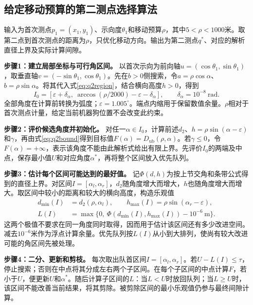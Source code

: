 \documentclass[UTF8,a4paper,12pt,fontset=fandol]{ctexart}
\newcommand{\nextpage}{\clearpage}
\begin{document}
\subsection{给定移动预算的第二测点选择算法}
输入为首次测点$p_1=(x_1,y_1)$、示向度$\theta_1$和移动预算$\rho$，其中$5<\rho<1000$米。取第二点到首次测点的距离为$\rho$，只优化移动方向。输出为第二测点$q^*$、对应的解析直径上界及实际计算间隙。

\noindent\textbf{步骤1：建立局部坐标与可行角区间。}
以首次示向为前向轴$u=(\cos\theta_1,\sin\theta_1)$，取垂直轴$v=(-\sin\theta_1,\cos\theta_1)$。先在$b>0$侧搜索，令$a=\rho\cos\alpha$、$b=\rho\sin\alpha$。将其代入式\eqref{eq:q2region}，结合横向高度$h>0$，得到
\begin{equation}\label{eq:q2angles}
 I_0=[\varepsilon+\delta_\alpha,\ \arccos(\rho/2000)-\varepsilon-\delta_\alpha],
 \qquad\delta_\alpha=10^{-8}\ \mathrm{rad}.
\end{equation}
全部角度在计算前转换为弧度；$\varepsilon=1.005^\circ$。端点内缩用于保留数值余量。$\rho$相对于首次测点计量，给定当前机器狗位置不会改变此约束。

\noindent\textbf{步骤2：评价候选角度并初始化。}
对任一$\alpha\in I_0$，计算前述$d_2$、$h=\rho\sin(\alpha-\varepsilon)$和$\gamma$，再由式\eqref{eq:q2bound}得到目标值$F(\alpha)=D_{\mathrm{ub}}(\rho,\alpha)$。若$\gamma\le0$，令$F(\alpha)=+\infty$，表示该角度不能由此解析式给出有限上界。先评价$I_0$的两端及中点，保存最小值$U$和对应角度$\alpha^*$，再将整个区间放入优先队列。

\nextpage
\noindent\textbf{步骤3：估计每个区间可能达到的最好值。}
记$\Phi(d,h)$为按上节交角和条带公式得到的直径上界。对区间$I=[\alpha_l,\alpha_r]$，$d_2$随角度增大而增大，$h$也随角度增大而增大。取区间中较小的距离和较大的横向高度，构造乐观值
\begin{equation}\label{eq:q2interval}
\begin{split}
 d_{\min}(I)&=d_2(\rho,\alpha_l),\qquad
 h_{\max}(I)=\rho\sin(\alpha_r-\varepsilon),\\
 L(I)&=\max\{0,\ \Phi(d_{\min}(I),h_{\max}(I))-10^{-6}\ \mathrm m\}.
\end{split}
\end{equation}
这两个极值不要求在同一角度同时取得，因而用于估计该区间还有多少改进空间。减去$10^{-6}$米作为浮点计算余量。优先队列按$L(I)$从小到大排列，使尚有较大改进可能的角区间先被处理。

\noindent\textbf{步骤4：二分、更新和剪枝。}
每次取出队首区间$I=[\alpha_l,\alpha_r]$。若$U-L(I)\le\tau$，停止搜索；否则在中点将其分成左右两个子区间。在每个子区间的中点计算$F$，若小于$U$，便更新$U$和$\alpha^*$。随后计算子区间的$L$：当$L<U$时放回队列；当$L\ge U$时，该区间不能改善当前结果，将其剪除。被剪除区间的最小乐观值仍参与最终间隙计算。
\end{document}
